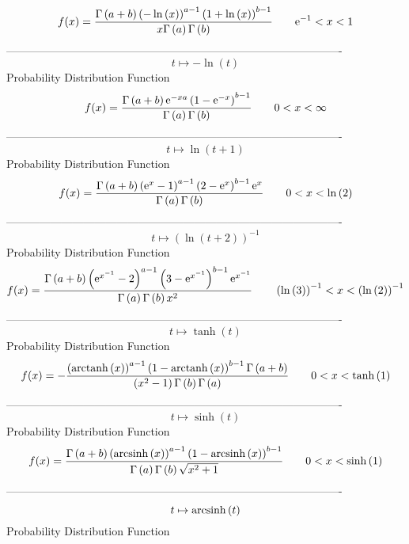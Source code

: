 \documentclass[12pt]{article}
\begin{document}
$$  f(x)={\frac {\Gamma \left( a+b \right)  \left( -\ln  \left( x \right) 
 \right) ^{a-1} \left( 1+\ln  \left( x \right)  \right) ^{b-1}}{x
\Gamma \left( a \right) \Gamma \left( b \right) }}
 \qquad{{\rm e}^{-1}}
 < x < 1
$$-------------------------------------------------------------------------------------------  \\$$t\mapsto -\ln  \left( t \right) 
$$Probability Distribution Function 
$$  f(x)={\frac {\Gamma \left( a+b \right) {{\rm e}^{-xa}} \left( 1-{{\rm e}^{-
x}} \right) ^{b-1}}{\Gamma \left( a \right) \Gamma \left( b \right) }}
 \qquad0
 < x < \infty 
$$-------------------------------------------------------------------------------------------  \\$$t\mapsto \ln  \left( t+1 \right) 
$$Probability Distribution Function 
$$  f(x)={\frac {\Gamma \left( a+b \right)  \left( {{\rm e}^{x}}-1 \right) ^{a-
1} \left( 2-{{\rm e}^{x}} \right) ^{b-1}{{\rm e}^{x}}}{\Gamma \left( a
 \right) \Gamma \left( b \right) }}
 \qquad0
 < x < \ln  \left( 2 \right) 
$$-------------------------------------------------------------------------------------------  \\$$t\mapsto  \left( \ln  \left( t+2 \right)  \right) ^{-1}
$$Probability Distribution Function 
$$  f(x)={\frac {\Gamma \left( a+b \right)  \left( {{\rm e}^{{x}^{-1}}}-2
 \right) ^{a-1} \left( 3-{{\rm e}^{{x}^{-1}}} \right) ^{b-1}{{\rm e}^{
{x}^{-1}}}}{\Gamma \left( a \right) \Gamma \left( b \right) {x}^{2}}}
 \qquad \left( \ln  \left( 3 \right)  \right) ^{-1}
 < x <  \left( \ln  \left( 2 \right)  \right) ^{-1}
$$-------------------------------------------------------------------------------------------  \\$$t\mapsto \tanh \left( t \right) 
$$Probability Distribution Function 
$$  f(x)=-{\frac { \left( {\rm arctanh} \left(x\right) \right) ^{a-1} \left( 1-
{\rm arctanh} \left(x\right) \right) ^{b-1}\Gamma \left( a+b \right) 
}{ \left( {x}^{2}-1 \right) \Gamma \left( b \right) \Gamma \left( a
 \right) }}
 \qquad0
 < x < \tanh \left( 1 \right) 
$$-------------------------------------------------------------------------------------------  \\$$t\mapsto \sinh \left( t \right) 
$$Probability Distribution Function 
$$  f(x)={\frac {\Gamma \left( a+b \right)  \left( {\rm arcsinh} \left(x\right)
 \right) ^{a-1} \left( 1-{\rm arcsinh} \left(x\right) \right) ^{b-1}}{
\Gamma \left( a \right) \Gamma \left( b \right) \sqrt {{x}^{2}+1}}}
 \qquad0
 < x < \sinh \left( 1 \right) 
$$-------------------------------------------------------------------------------------------  \\$$t\mapsto {\rm arcsinh} \left(t\right)
$$Probability Distribution Function 
\end{document}
